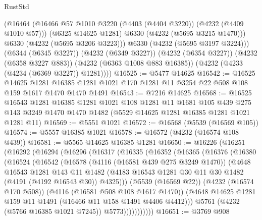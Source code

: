 \begin{lexlean}{RustStd}
\begin{coremodule}
            (@16464
              (@16466 @57 @1010 @3220 (@4403 (@4404 @3220)) (@4232 (@4409 @1010 @57)))
              (@6325 @14625 @1281)
              @6330
              (@4232 (@5695 @3215 @1470)))
            @6330
            (@4232 (@5695 @3206 @3223)))
          @6330
          (@4232 (@5695 @3197 @3224)))
        (@6344 (@6345 @3227))
        (@4232 (@6349 @3227))
        (@4232 (@6354 @3227))
        (@4232 (@6358 @3227 @883))
        (@4232 (@6363 @1008 @883 @16385))
        (@4232 (@4233 (@4234 (@6369 @3227)) @1281))))
@16525 := @5477 @14625
@16542 := @16525
    @14625
    @1281
    @16385
    @1281
    @1021
    @170
    @1281
    @11
    @3254
    @22
    @508
    @108
    @159
    @1617
    @1470
    @1470
    @1491
@16543 := @7216 @14625
@16568 := @16525
    @16543
    @1281
    @16385
    @1281
    @1021
    @108
    @1281
    @11
    @1681
    @105
    @439
    @275
    @143
    @3249
    @1470
    @1470
    @1482
    (@5529 @14625 @1281 @16385 @1281 @1021 @1281 @11)
@16569 := @5551 @1021
@16572 := @16568 (@5539 (@16569 @105))
@16574 := @5557 @16385 @1021
@16578 := @16572 (@4232 (@16574 @108 @439))
@16581 := @5565 @14625 @16385 @1281
@16650 := @16226
    (@16251
      (@16292
        (@16294
          (@16296
            (@16317
              (@16335
                (@16352
                  (@16365
                    (@16376
                      (@16380
                        (@16524
                          (@16542
                            (@16578
                              (@4116 (@16581 @439 @275 @3249 @1470))
                              (@4648
                                @16543
                                @1281
                                @143
                                @11
                                @1482
                                (@4183
                                  @16543
                                  @1281
                                  @30
                                  @11
                                  @30
                                  @1482
                                  (@4191 (@4192 @16543 @30))
                                  @4325)))
                            (@5539 (@16569 @22))
                            (@4232 (@16574 @170 @508))
                            (@4116 (@16581 @508 @108 @1617 @1470))
                            (@4648 @14625 @1281 @159 @11 @1491 (@16466 @11 @158 @1491 @4406 @4412)))
                          @5761
                          (@4232 (@5766 @16385 @1021 @7245))
                          @5773)))))))))))
@16651 := @3769 @908

\end{coremodule}
\end{lexlean}
